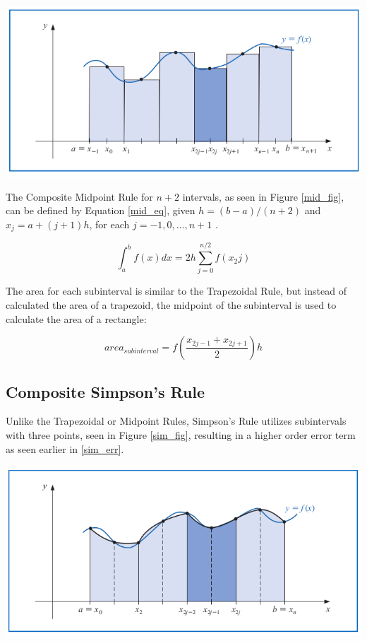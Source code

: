 \documentclass[a4paper]{article}
\begin{document}
\begin{center}
	\includegraphics[width=1\textwidth]{../additional/midpoint_fig.png}
	\label{mid_fig}
\end{center}

The Composite Midpoint Rule for $n+2$ intervals, as seen in Figure \ref{mid_fig}, can be defined by Equation \ref{mid_eq}, given $h=(b-a)/(n+2)$ and $x_j=a+(j+1)h$, for each $j=-1,0,\dots,n+1$ \citep{burden2010}.

\begin{equation}
\int_{a}^b f(x) dx = 2h \sum_{j=0}^{n/2}f(x_2j)
\label{mid_eq}
\end{equation}

The area for each subinterval is similar to the Trapezoidal Rule, but instead of calculated the area of a trapezoid, the midpoint of the subinterval is used to calculate the area of a rectangle:

\begin{equation}
area_{subinterval} = f(\frac{x_{2j-1}+x_{2j+1}}{2})h
\end{equation}

\subsection{Composite Simpson's Rule}\label{method:simpsons}

Unlike the Trapezoidal or Midpoint Rules, Simpson's Rule utilizes subintervals with three points, seen in Figure \ref{sim_fig}, resulting in a higher order error term as seen earlier in \ref{sim_err}.

\begin{center}
	\includegraphics[width=1\textwidth]{../additional/simpsons_fig.png}
	\label{sim_fig}
\end{center}
\end{document}
